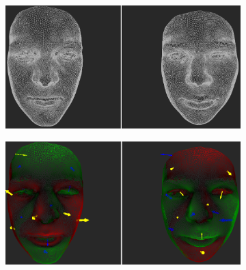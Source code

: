\begin{figure}[h]
\centering
\begin{subfigure}{0.49\textwidth}
\includegraphics[width=\textwidth]{./img-study/pair13.PNG}
\caption{}
\label{fig:study-5-13}
\end{subfigure}
\begin{subfigure}{0.49\textwidth}
\includegraphics[width=\textwidth]{./img-study/pair11.PNG}
\caption{}
\label{fig:study-5-11}
\end{subfigure}


\end{figure}
